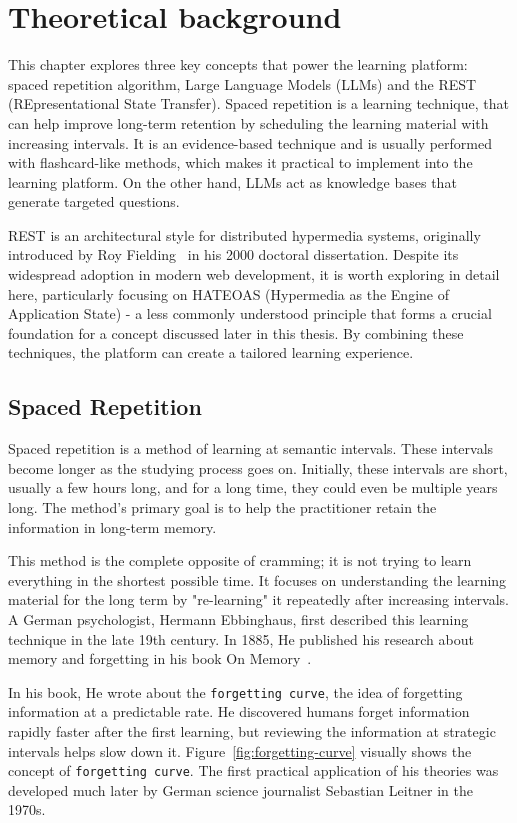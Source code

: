 \chapter{Theoretical background}\label{ch:theoretical-background}

This chapter explores three key concepts that power the learning platform: spaced repetition algorithm, Large Language Models (LLMs) and the REST (REpresentational State Transfer). Spaced repetition is a learning technique, that can help improve long-term retention by scheduling the learning material with increasing intervals. It is an evidence-based technique and is usually performed with flashcard-like methods, which makes it practical to implement into the learning platform. On the other hand, LLMs act as knowledge bases that generate targeted questions.

REST is an architectural style for distributed hypermedia systems, originally introduced by Roy Fielding~\cite{fielding2000} in his 2000 doctoral dissertation. Despite its widespread adoption in modern web development, it is worth exploring in detail here, particularly focusing on HATEOAS (Hypermedia as the Engine of Application State) - a less commonly understood principle that forms a crucial foundation for a concept discussed later in this thesis. By combining these techniques, the platform can create a tailored learning experience.

\section{Spaced Repetition}

Spaced repetition is a method of learning at semantic intervals. These intervals become longer as the studying process goes on. Initially, these intervals are short, usually a few hours long, and for a long time, they could even be multiple years long. The method's primary goal is to help the practitioner retain the information in long-term memory.

This method is the complete opposite of cramming; it is not trying to learn everything in the shortest possible time. It focuses on understanding the learning material for the long term by "re-learning" it repeatedly after increasing intervals. A German psychologist, Hermann Ebbinghaus, first described this learning technique in the late 19th century. In 1885, He published his research about memory and forgetting in his book On Memory~\cite{ebbinghaus1964memory}.

In his book, He wrote about the \texttt{forgetting curve}, the idea of forgetting information at a predictable rate. He discovered humans forget information rapidly faster after the first learning, but reviewing the information at strategic intervals helps slow down it. Figure~\ref{fig:forgetting-curve} visually shows the concept of \texttt{forgetting curve}. The first practical application of his theories was developed much later by German science journalist Sebastian Leitner in the 1970s.

